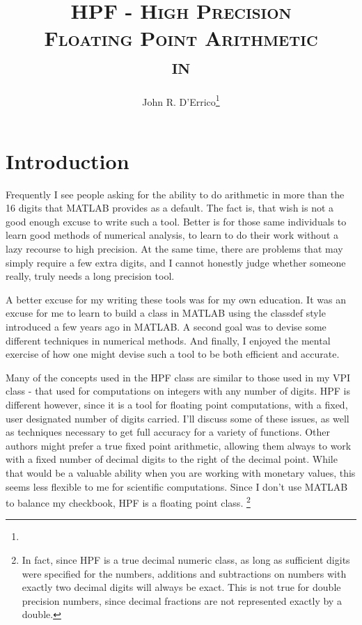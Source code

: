 \documentclass[a4paper,12pt]{article}
\title{\textsc{HPF - High Precision\\ Floating Point Arithmetic\\in \Ml}}
\author{John R. D'Errico\footnote{\email{woodchips@rochester.rr.com}}}
\begin{document}


\maketitle

\newpage

\tableofcontents\newpage
{}


\section{Introduction}

Frequently I see people asking for the ability to do arithmetic in more than the 16 digits that MATLAB provides as a default. The fact is, that wish is not a good enough excuse to write such a tool. Better is for those same individuals to learn good methods of numerical analysis, to learn to do their work without a lazy recourse to high precision. At the same time, there are problems that may simply require a few extra digits, and I cannot honestly judge whether someone really, truly needs a long precision tool.

A better excuse for my writing these tools was for my own education. It was an excuse for me to learn to build a class in MATLAB using the classdef style introduced a few years ago in MATLAB. A second goal was to devise some different techniques in numerical methods. And finally, I enjoyed the mental exercise of how one might devise such a tool to be both efficient and accurate.

Many of the concepts used in the HPF class are similar to those used in my VPI class - that used for computations on integers with any number of digits. HPF is different however, since it is a tool for floating point computations, with a fixed, user designated number of digits carried. I'll discuss some of these issues, as well as techniques necessary to get full accuracy for a variety of functions. Other authors might prefer a true fixed point arithmetic, allowing them always to work with a fixed number of decimal digits to the right of the decimal point. While that would be a valuable ability when you are working with monetary values, this seems less flexible to me for scientific computations. Since I don't use MATLAB to balance my checkbook, HPF is a floating point class. \footnote{In fact, since HPF is a true decimal numeric class, as long as sufficient digits were specified for the numbers, additions and subtractions on numbers with exactly two decimal digits will always be exact. This is not true for double precision numbers, since decimal fractions are not represented exactly by a double.}
\end{document}
